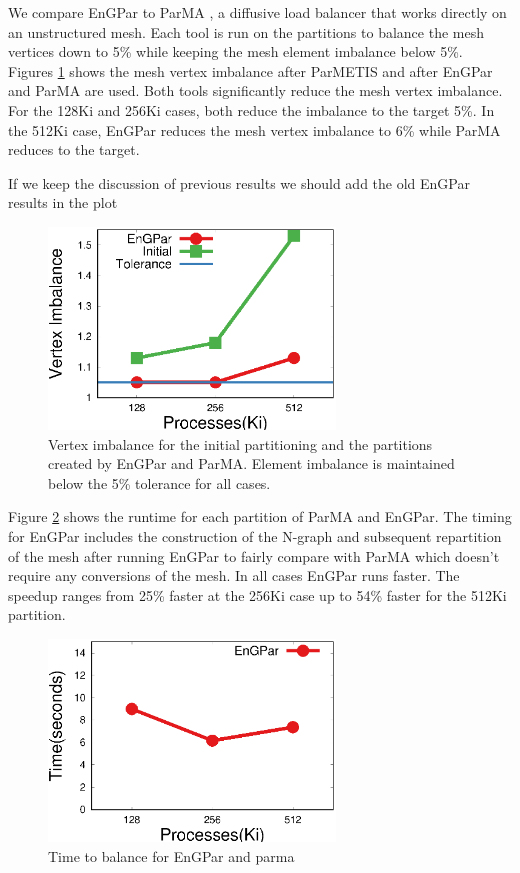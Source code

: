 \documentclass[conference]{IEEEtran}
\begin{document}
We compare EnGPar to ParMA \cite{SmithParma2015}, a diffusive load balancer that
works directly on an unstructured mesh.
Each tool is run on the partitions to balance the mesh vertices down to 5\% while keeping the mesh
element imbalance below 5\%. Figures \ref{fig:fem_vtximb} shows the mesh vertex imbalance after
ParMETIS and after EnGPar and ParMA are used. Both tools significantly reduce the mesh vertex
imbalance. For the 128Ki and 256Ki cases, both reduce the imbalance to the target 5\%. In
the 512Ki case, EnGPar reduces the mesh vertex imbalance to 6\% while ParMA reduces to the
target.

{\color{red} If we keep the discussion of previous results we should add the old EnGPar results in the plot}
\begin{figure}[!ht]
  \centering
  \includegraphics[width=3in]{plots/mira_fem_results/vimb_v_cores}
  \caption{Vertex imbalance for the initial partitioning and the partitions created by
    EnGPar and ParMA. Element imbalance is maintained below the 5\% tolerance for all cases.}
  \label{fig:fem_vtximb}
\end{figure}

Figure \ref{fig:fem_time} shows the runtime for each partition of ParMA and EnGPar. The
timing for EnGPar includes the construction of the N-graph and subsequent repartition of
the mesh after running EnGPar to fairly compare with ParMA which doesn't require any
conversions of the mesh. In all cases EnGPar runs faster. The speedup ranges from
25\% faster at the 256Ki case up to 54\% faster for the 512Ki partition.

\begin{figure}[!ht]
  \centering
  \includegraphics[width=3in]{plots/mira_fem_results/time_v_cores}
  \caption{Time to balance for EnGPar and parma}
  \label{fig:fem_time}
\end{figure}
\end{document}
